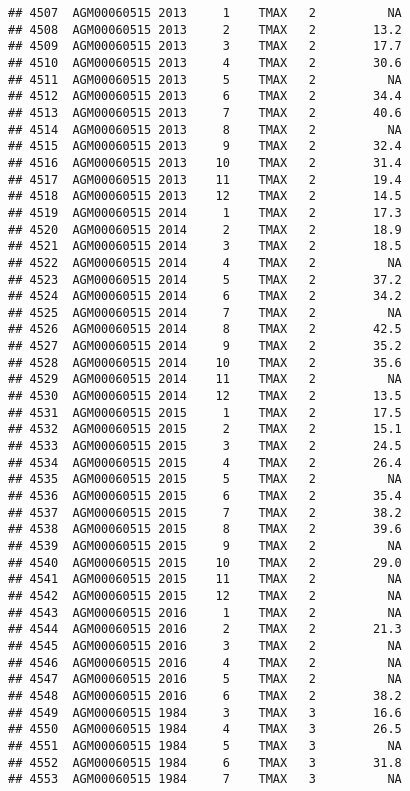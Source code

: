 \documentclass{article}\usepackage[]{graphicx}\usepackage[]{color}
\makeatletter
\newenvironment{kframe}{%
 \def\at@end@of@kframe{}%
 \ifinner\ifhmode%
  \def\at@end@of@kframe{\end{minipage}}%
  \begin{minipage}{\columnwidth}%
 \fi\fi%
 \def\FrameCommand##1{\hskip\@totalleftmargin \hskip-\fboxsep
 \colorbox{shadecolor}{##1}\hskip-\fboxsep
     \hskip-\linewidth \hskip-\@totalleftmargin \hskip\columnwidth}%
 \MakeFramed {\advance\hsize-\width
   \@totalleftmargin\z@ \linewidth\hsize
   \@setminipage}}%
 {\par\unskip\endMakeFramed%
 \at@end@of@kframe}
\newenvironment{knitrout}{}{} %
\makeatother
\begin{document}
\begin{knitrout}
\begin{kframe}
\begin{verbatim}
## 4507  AGM00060515 2013     1    TMAX   2          NA
## 4508  AGM00060515 2013     2    TMAX   2        13.2
## 4509  AGM00060515 2013     3    TMAX   2        17.7
## 4510  AGM00060515 2013     4    TMAX   2        30.6
## 4511  AGM00060515 2013     5    TMAX   2          NA
## 4512  AGM00060515 2013     6    TMAX   2        34.4
## 4513  AGM00060515 2013     7    TMAX   2        40.6
## 4514  AGM00060515 2013     8    TMAX   2          NA
## 4515  AGM00060515 2013     9    TMAX   2        32.4
## 4516  AGM00060515 2013    10    TMAX   2        31.4
## 4517  AGM00060515 2013    11    TMAX   2        19.4
## 4518  AGM00060515 2013    12    TMAX   2        14.5
## 4519  AGM00060515 2014     1    TMAX   2        17.3
## 4520  AGM00060515 2014     2    TMAX   2        18.9
## 4521  AGM00060515 2014     3    TMAX   2        18.5
## 4522  AGM00060515 2014     4    TMAX   2          NA
## 4523  AGM00060515 2014     5    TMAX   2        37.2
## 4524  AGM00060515 2014     6    TMAX   2        34.2
## 4525  AGM00060515 2014     7    TMAX   2          NA
## 4526  AGM00060515 2014     8    TMAX   2        42.5
## 4527  AGM00060515 2014     9    TMAX   2        35.2
## 4528  AGM00060515 2014    10    TMAX   2        35.6
## 4529  AGM00060515 2014    11    TMAX   2          NA
## 4530  AGM00060515 2014    12    TMAX   2        13.5
## 4531  AGM00060515 2015     1    TMAX   2        17.5
## 4532  AGM00060515 2015     2    TMAX   2        15.1
## 4533  AGM00060515 2015     3    TMAX   2        24.5
## 4534  AGM00060515 2015     4    TMAX   2        26.4
## 4535  AGM00060515 2015     5    TMAX   2          NA
## 4536  AGM00060515 2015     6    TMAX   2        35.4
## 4537  AGM00060515 2015     7    TMAX   2        38.2
## 4538  AGM00060515 2015     8    TMAX   2        39.6
## 4539  AGM00060515 2015     9    TMAX   2          NA
## 4540  AGM00060515 2015    10    TMAX   2        29.0
## 4541  AGM00060515 2015    11    TMAX   2          NA
## 4542  AGM00060515 2015    12    TMAX   2          NA
## 4543  AGM00060515 2016     1    TMAX   2          NA
## 4544  AGM00060515 2016     2    TMAX   2        21.3
## 4545  AGM00060515 2016     3    TMAX   2          NA
## 4546  AGM00060515 2016     4    TMAX   2          NA
## 4547  AGM00060515 2016     5    TMAX   2          NA
## 4548  AGM00060515 2016     6    TMAX   2        38.2
## 4549  AGM00060515 1984     3    TMAX   3        16.6
## 4550  AGM00060515 1984     4    TMAX   3        26.5
## 4551  AGM00060515 1984     5    TMAX   3          NA
## 4552  AGM00060515 1984     6    TMAX   3        31.8
## 4553  AGM00060515 1984     7    TMAX   3          NA

\end{verbatim}
\end{kframe}
\end{knitrout}
\end{document}
